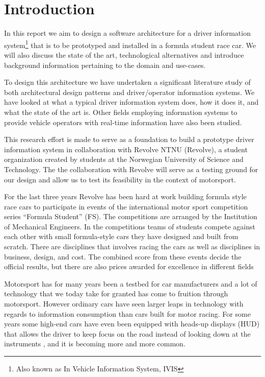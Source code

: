 
\chapter{Introduction}

In this report we aim to design a software architecture for a driver information
system\footnote{Also known as In Vehicle Information System, IVIS}
that is to be prototyped and installed in a formula student race car. We will
also discuss the state of the art, technological alternatives and introduce
background information pertaining to the domain and use-cases.

To design this architecture we have undertaken a significant literature study
of both architectural design patterns and driver/operator information systems.
We have looked at what a typical driver information system does, how it does
it, and what the state of the art is. Other fields employing information 
systems to provide vehicle operators with real-time information have also been
studied.

This research effort is made to serve as a foundation to build a prototype
driver information system in collaboration with Revolve NTNU (Revolve), a 
student organization  created by students at the Norwegian University of 
Science and Technology.
The the collaboration with Revolve will serve as a testing ground for our 
design and allow us to test its feasibility in the
context of motorsport.

For the last three years Revolve has been hard at work building formula style race
cars to participate in events of the international motor sport competition series
``Formula Student'' (FS). The competitions are arranged by the Institution of Mechanical Engineers. In the competitions teams of students compete against each other
with small formula-style cars they have designed and built from scratch. There are
disciplines that involves racing the cars as well as disciplines in business,
design, and cost. The combined score from these events decide the official
results, but there are also prices awarded for excellence in different fields

Motorsport has for many years been a testbed for car manufacturers and a lot of
technology that we today take for granted has come to fruition through motorsport. However
ordinary cars have seen larger leaps in technology with regards to information
consumption than cars built for motor racing. For some years some high-end cars
have even been equipped with heads-up displays (HUD) that allows the driver to 
keep focus on the road instead of looking down at the instruments \cite{wiki:hud},
and it is becoming more and more common.

